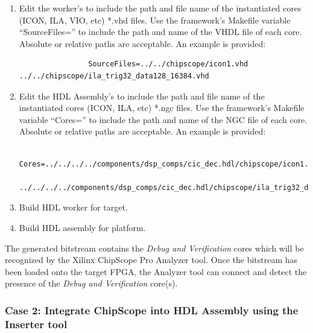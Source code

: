 \begin{flushleft}
\begin{enumerate}
			\item Edit the worker's  to include the path and file name of the
			instantiated cores (ICON, ILA, VIO, etc) *.vhd files. Use the framework's Makefile
			variable ``SourceFiles='' to include the path and name of the VHDL file of each core.
			Absolute or relative paths are acceptable. An example is provided:
			\small\begin{verbatim}
				SourceFiles=../../chipscope/icon1.vhd ../../chipscope/ila_trig32_data128_16384.vhd
			\end{verbatim}
		 	\item Edit the HDL Assembly's  to include the path and file name of
		 	the	instantiated cores (ICON, ILA, etc) *.ngc files. Use the framework's
		 	Makefile variable ``Cores='' to include the path and name of the NGC file of each
		 	core. Absolute or relative paths are acceptable. An example is provided:
		 	\small\begin{verbatim}
		 		Cores=../../../../components/dsp_comps/cic_dec.hdl/chipscope/icon1.ngc
		 		../../../../components/dsp_comps/cic_dec.hdl/chipscope/ila_trig32_data128_16384.ngc
		 	\end{verbatim}
		 	\item Build HDL worker for target.
			\item Build HDL assembly for platform.
		\end{enumerate}

		The generated bitstream contains the \textit{Debug and Verification} cores which will be recognized by the Xilinx ChipScope Pro Analyzer tool. Once the bitstream has been loaded onto the target FPGA, the Analyzer tool can connect and detect the presence of the \textit{Debug and Verification} core(s).

	\newpage

	\subsubsection{Case 2: Integrate ChipScope into HDL Assembly using the Inserter tool}


\end{flushleft}
